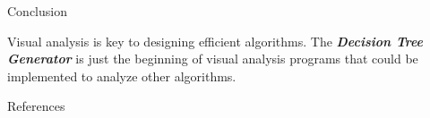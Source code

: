 \documentclass[final]{beamer}
\newlength{\onecolwid}
\begin{document}
\begin{frame}[t]
\begin{columns}[t]
\begin{column}{\onecolwid}
\begin{block}{Conclusion}

Visual analysis is key to designing efficient algorithms. The \textit{\textbf{Decision Tree
Generator}} is just the beginning of visual analysis programs that could be implemented to analyze
other algorithms.

\end{block}


\begin{block}{References}

\nocite{*} %
\small{
\vspace{0.75in}}

\end{block}

\end{column} %

\end{columns} %

\end{frame} %
\end{document}
